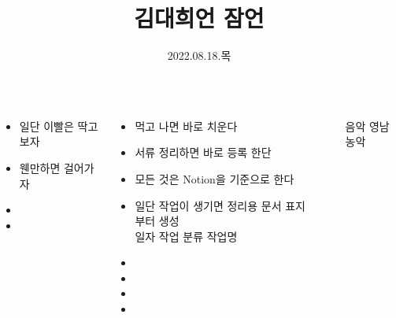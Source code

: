\documentclass[25pt, a1paper ]{tikzposter}
\title{김대희언 잠언 }
\author{ 2022.08.18.목 }
\begin{document}
	\maketitle

	\begin{columns}
			{
			\setlength{\leftmargini}{2em}			
			\setlength{\labelsep}{1em} %
				\begin{LARGE}
					\begin{itemize}
					\item 일단 이빨은  딱고 보자
					\item 웬만하면 걸어가자
					\item 
					\item 
					\end{itemize}
				\end{LARGE}
			}





		{
			\setlength{\leftmargini}{3em}			
			\setlength{\labelsep}{1em} %
			\begin{LARGE}
			\begin{itemize}
			\item 먹고 나면 바로 치운다
			\item 서류 정리하면 바로 등록 한단
			\item 모든 것은 Notion을 기준으로 한다
			\item 일단 작업이 생기면 정리용 문서 표지 부터 생성\\
					일자
					작업 분류
					작업명
			\item 
			\item 
			\item 
			\item 
			\end{itemize}
			\end{LARGE}
		}		


		{
			\setlength{\leftmargini}{7em}			
			\setlength{\labelsep}{1em} %
			\begin{LARGE}
			\begin{itemize}
			\item [음악] 영남 농악
			\end{itemize}
			\end{LARGE}
		}	%





\end{columns}
\end{document}
